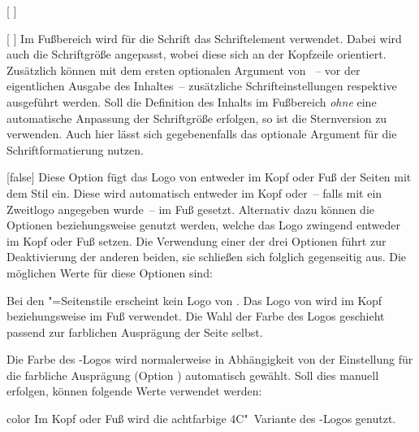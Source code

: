 \begin{Declaration*}{}
\begin{Declaration*}{}
\begin{Declaration*}{}
\begin{Declaration}{%
  [%
  ]%
}
\begin{Declaration}[v2.04]{%
  [%
  ]%
}
Im Fußbereich wird für die Schrift das Schriftelement  
verwendet. Dabei wird auch die Schriftgröße angepasst, wobei diese sich an der 
Kopfzeile orientiert. Zusätzlich können mit dem ersten optionalen Argument von 
~-- vor der eigentlichen Ausgabe des Inhaltes~-- zusätzliche 
Schrifteinstellungen respektive  ausgeführt werden. Soll die 
Definition des Inhalts im Fußbereich \emph{ohne} eine automatische Anpassung 
der Schriftgröße erfolgen, so ist die Sternversion  zu 
verwenden. Auch hier lässt sich gegebenenfalls das optionale Argument für die 
Schriftformatierung nutzen.
\end{Declaration}
\end{Declaration}

\begin{Declaration}[%
  v2.02:Logo von \DDC automatisch in Kopf/Fuß;%
  v2.02!\Option{ddc=colorblack};
  v2.02!\Option{ddc=gray};
  v2.02!\Option{ddc=black};
  v2.02!\Option{ddc=blue};
  v2.02!\Option{ddc=white};
]{}[false]
\printdeclarationlist%
%
%
%
%
%
Diese Option fügt das Logo von \DDC entweder im Kopf oder Fuß der Seiten mit 
dem Stil  ein. Diese wird automatisch entweder im Kopf 
oder~-- falls mit  ein Zweitlogo angegeben wurde~-- im Fuß 
gesetzt. Alternativ dazu können die Optionen  beziehungsweise 
 genutzt werden, welche das Logo zwingend entweder im Kopf oder 
Fuß setzen. Die Verwendung einer der drei Optionen führt zur Deaktivierung der 
anderen beiden, sie schließen sich folglich gegenseitig aus. Die möglichen 
Werte für diese Optionen sind:
%
\begin{values}{}
\itemfalse
  Bei den "=Seitenstile erscheint kein Logo von \DDC.
\itemtrue*
  Das Logo von \DDC wird im Kopf beziehungsweise im Fuß verwendet. Die Wahl der 
  Farbe des Logos geschieht passend zur farblichen Ausprägung der Seite selbst.
\end{values}
%
Die Farbe des \DDC-Logos wird normalerweise in Abhängigkeit von der Einstellung 
für die farbliche Ausprägung (Option ) automatisch gewählt. 
Soll dies manuell erfolgen, können folgende Werte verwendet werden:
%
\begin{values}{}
\item[color]
  Im Kopf oder Fuß wird die achtfarbige 4C"~Variante des \DDC-Logos genutzt.

\end{values}
\end{Declaration}
\end{Declaration*}
\end{Declaration*}
\end{Declaration*}
